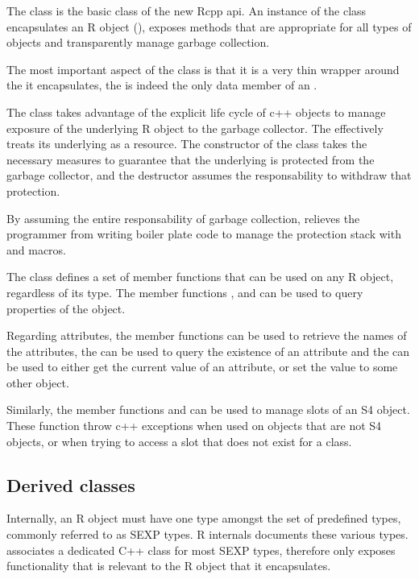 The  class is the basic class of the new Rcpp api. 
An instance of the  class encapsulates an R object
(), exposes methods that are appropriate for all types 
of objects and transparently manage garbage collection.

The most important aspect of the  class is that it is 
a very thin wrapper around the  it encapsulates, the 
 is indeed the only data member of an .

The  class takes advantage of the explicit life cycle of 
c++ objects to manage exposure of the underlying R object to the 
garbage collector. The  effectively treats 
its underlying  as a resource.
The constructor of the  class takes 
the necessary measures to guarantee that the underlying 
is protected from the garbage collector, and the destructor
assumes the responsability to withdraw that protection. 

By assuming the entire responsability of garbage collection, 
relieves the programmer from writing boiler plate code to manage
the protection stack with  and  macros.

The  class defines a set of member functions that
can be used on any R object, regardless of its type. The member
functions ,  and  can be 
used to query properties of the object. 

Regarding attributes, the member functions 
 can be used to retrieve the names of the attributes, 
the  can be used to query the existence of an attribute and 
the  can be used to either get the current value of an 
attribute, or set the value to some other object.

Similarly, the member functions  and 
can be used to manage slots of an S4 object. These function throw 
c++ exceptions when used on objects that are not S4 objects, or when 
trying to access a slot that does not exist for a class.

\subsection{Derived classes}

Internally, an R object must have one type amongst the set of 
predefined types, commonly referred to as SEXP types. R internals
\citep{R:ints} documents these various types. 
 associates a dedicated C++ class for most SEXP types, 
therefore only exposes functionality that is relevant to the R object
that it encapsulates.

